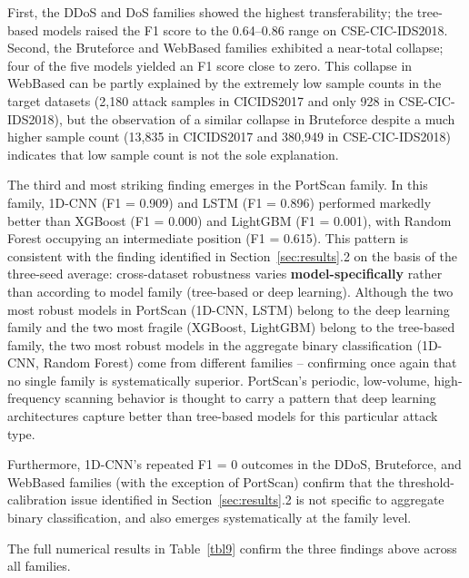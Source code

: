 \documentclass[a4paper,fleqn]{cas-sc}
\begin{document}
First, the DDoS and DoS families showed the highest transferability; the tree-based models raised the F1 score to the 0.64--0.86 range on CSE-CIC-IDS2018. Second, the Bruteforce and WebBased families exhibited a near-total collapse; four of the five models yielded an F1 score close to zero. This collapse in WebBased can be partly explained by the extremely low sample counts in the target datasets (2,180 attack samples in CICIDS2017 and only 928 in CSE-CIC-IDS2018), but the observation of a similar collapse in Bruteforce despite a much higher sample count (13,835 in CICIDS2017 and 380,949 in CSE-CIC-IDS2018) indicates that low sample count is not the sole explanation.

The third and most striking finding emerges in the PortScan family. In this family, 1D-CNN (F1 = 0.909) and LSTM (F1 = 0.896) performed markedly better than XGBoost (F1 = 0.000) and LightGBM (F1 = 0.001), with Random Forest occupying an intermediate position (F1 = 0.615). This pattern is consistent with the finding identified in Section~\ref{sec:results}.2 on the basis of the three-seed average: cross-dataset robustness varies \textbf{model-specifically} rather than according to model family (tree-based or deep learning). Although the two most robust models in PortScan (1D-CNN, LSTM) belong to the deep learning family and the two most fragile (XGBoost, LightGBM) belong to the tree-based family, the two most robust models in the aggregate binary classification (1D-CNN, Random Forest) come from different families -- confirming once again that no single family is systematically superior. PortScan's periodic, low-volume, high-frequency scanning behavior is thought to carry a pattern that deep learning architectures capture better than tree-based models for this particular attack type.

Furthermore, 1D-CNN's repeated F1 = 0 outcomes in the DDoS, Bruteforce, and WebBased families (with the exception of PortScan) confirm that the threshold-calibration issue identified in Section~\ref{sec:results}.2 is not specific to aggregate binary classification, and also emerges systematically at the family level.

The full numerical results in Table~\ref{tbl9} confirm the three findings above across all families.
\end{document}
